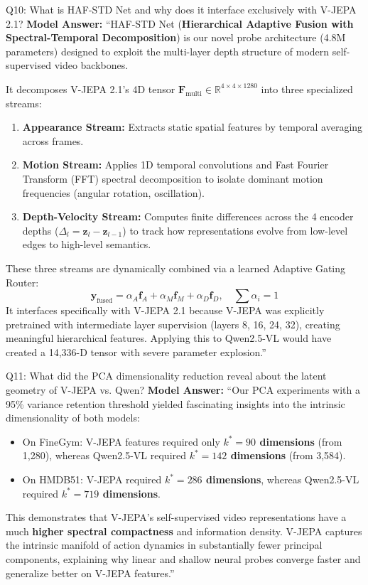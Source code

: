 \documentclass[a4paper, 11pt]{article}
\begin{document}
\begin{defensebox}{Q10: What is HAF-STD Net and why does it interface exclusively with V-JEPA 2.1?}
\textbf{Model Answer:}
``HAF-STD Net (\textbf{Hierarchical Adaptive Fusion with Spectral-Temporal Decomposition}) is our novel probe architecture (4.8M parameters) designed to exploit the multi-layer depth structure of modern self-supervised video backbones.

It decomposes V-JEPA 2.1's 4D tensor $\mathbf{F}_{\text{multi}} \in \mathbb{R}^{4 \times 4 \times 1280}$ into three specialized streams:
\begin{enumerate}
    \item \textbf{Appearance Stream:} Extracts static spatial features by temporal averaging across frames.
    \item \textbf{Motion Stream:} Applies 1D temporal convolutions and Fast Fourier Transform (FFT) spectral decomposition to isolate dominant motion frequencies (angular rotation, oscillation).
    \item \textbf{Depth-Velocity Stream:} Computes finite differences across the 4 encoder depths ($\Delta_l = \mathbf{z}_{l} - \mathbf{z}_{l-1}$) to track how representations evolve from low-level edges to high-level semantics.
\end{enumerate}
These three streams are dynamically combined via a learned Adaptive Gating Router:
$$\mathbf{y}_{\text{fused}} = \alpha_A \mathbf{f}_A + \alpha_M \mathbf{f}_M + \alpha_D \mathbf{f}_D, \quad \sum \alpha_i = 1$$
It interfaces specifically with V-JEPA 2.1 because V-JEPA was explicitly pretrained with intermediate layer supervision (layers 8, 16, 24, 32), creating meaningful hierarchical features. Applying this to Qwen2.5-VL would have created a 14,336-D tensor with severe parameter explosion.''
\end{defensebox}

\vspace{0.2cm}

\begin{defensebox}{Q11: What did the PCA dimensionality reduction reveal about the latent geometry of V-JEPA vs. Qwen?}
\textbf{Model Answer:}
``Our PCA experiments with a 95\% variance retention threshold yielded fascinating insights into the intrinsic dimensionality of both models:
\begin{itemize}
    \item On FineGym: V-JEPA features required only \textbf{$k^* = 90$ dimensions} (from 1,280), whereas Qwen2.5-VL required \textbf{$k^* = 142$ dimensions} (from 3,584).
    \item On HMDB51: V-JEPA required \textbf{$k^* = 286$ dimensions}, whereas Qwen2.5-VL required \textbf{$k^* = 719$ dimensions}.
\end{itemize}
This demonstrates that V-JEPA's self-supervised video representations have a much \textbf{higher spectral compactness} and information density. V-JEPA captures the intrinsic manifold of action dynamics in substantially fewer principal components, explaining why linear and shallow neural probes converge faster and generalize better on V-JEPA features.''
\end{defensebox}
\end{document}
